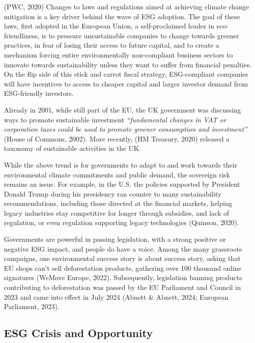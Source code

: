 \documentclass[
  12pt,
  letterpaper,
  DIV=11,
  numbers=noendperiod]{scrartcl}
\begin{document}
(PWC, 2020) Changes to laws and regulations aimed at achieving climate
change mitigation is a key driver behind the wave of ESG adoption. The
goal of these laws, first adopted in the European Union, a
self-proclaimed leader in eco-friendliness, is to pressure unsustainable
companies to change towards greener practices, in fear of losing their
access to future capital, and to create a mechanism forcing entire
environmentally non-compliant business sectors to innovate towards
sustainability unless they want to suffer from financial penalties. On
the flip side of this stick and carrot fiscal strategy, ESG-compliant
companies will have incentives to access to cheaper capital and larger
investor demand from ESG-friendly investors.

Already in 2001, while still part of the EU, the UK government was
discussing ways to promote sustainable investment \emph{``fundamental
changes in VAT or corporation taxes could be used to promote greener
consumption and investment''} (House of Commons, 2002). More recently,
(HM Treasury, 2020) released a taxonomy of sustainable activities in the
UK.

While the above trend is for governments to adapt to and work towards
their environmental climate commitments and public demand, the sovereign
risk remains an issue. For example, in the U.S. the policies supported
by President Donald Trump during his presidency ran counter to many
sustainability recommendations, including those directed at the
financial markets, helping legacy industries stay competitive for longer
through subsidies, and lack of regulation, or even regulation supporting
legacy technologies (Quinson, 2020).

Governments are powerful in passing legislation, with a strong positive
or negative ESG impact, and people do have a voice. Among the many
grassroots campaigns, one environmental success story is about success
story, asking that EU shops can't sell deforestation products, gathering
over 100 thousand online signatures (WeMove Europe, 2022). Subsequently,
legislation banning products contributing to deforestation was passed by
the EU Parliament and Council in 2023 and came into effect in July 2024
(Abnett \& Abnett, 2024; European Parliament, 2023).

\subsection{ESG Crisis and
Opportunity}\label{esg-crisis-and-opportunity}
\end{document}
